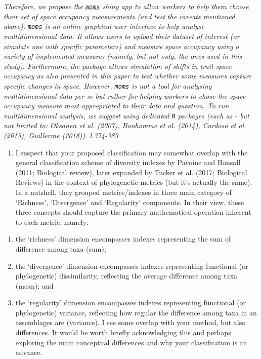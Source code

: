 \documentclass[]{article}
\providecommand{\tightlist}{%
  \setlength{\itemsep}{0pt}\setlength{\parskip}{0pt}}
\begin{document}
\textit{Therefore, we propose the
\href{https://tguillerme.shinyapps.io/moms/}{\texttt{moms}} shiny app to
allow workers to help them choose their set of space occupancy
measurements (and test the caveats mentioned above). \texttt{moms} is an
online graphical user interface to help analyse multidimensional data.
It allows users to upload their dataset of interest (or simulate one
with specific parameters) and measure space occupancy using a variety of
implemented measures (namely, but not only, the ones used in this
study). Furthermore, the package allows simulation of shifts in trait
space occupancy as also presented in this paper to test whether some
measures capture specific changes in space. However, \texttt{moms} is
not a tool for analysing multidimensional data \emph{per se} but rather
for helping workers to chose the space occupancy measure most
appropriated to their data and question. To run multidimensional
analysis, we suggest using dedicated \texttt{R} packages (such as - but
not limited to: Oksanen et al. (2007), Bonhomme et al. (2014), Cardoso
et al. (2015), Guillerme (2018)). l.374-383}

\begin{enumerate}
\def\labelenumi{\arabic{enumi})}
\setcounter{enumi}{1}
\tightlist
\item
  I suspect that your proposed classification may somewhat overlap with
  the general classification scheme of diversity indexes by Pavoine and
  Bonsall (2011; Biological review), later expanded by Tucker et al.
  (2017; Biological Reviews) in the context of phylogenetic metrics (but
  it's actually the same). In a nutshell, they grouped metrics/indexes
  in three main category of `Richness', `Divergence' and `Regularity'
  components. In their view, these three concepts should capture the
  primary mathematical operation inherent to each metric, namely:
\end{enumerate}

\begin{enumerate}
\def\labelenumi{\roman{enumi})}
\tightlist
\item
  the `richness' dimension encompasses indexes representing the sum of
  difference among taxa (sum);
\item
  the `divergence' dimension encompasses indexes representing functional
  (or phylogenetic) dissimilarity, reflecting the average difference
  among taxa (mean); and
\item
  the `regularity' dimension encompasses indexes representing functional
  (or phylogenetic) variance, reflecting how regular the difference
  among taxa in an assemblages are (variance). I see some overlap with
  your method, but also differences. It would be worth briefly
  acknowledging this and perhaps exploring the main conceptual
  differences and why your classification is an advance.
\end{enumerate}
\end{document}
